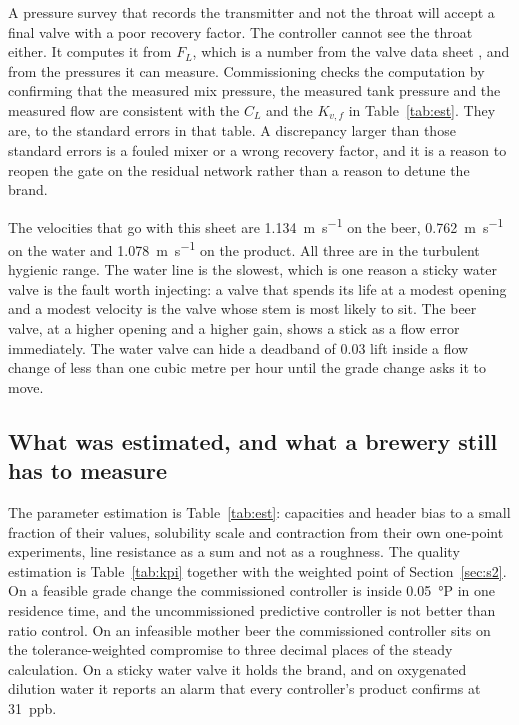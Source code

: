 A pressure survey that records the transmitter and not the throat will accept a final valve with a poor recovery factor. The controller cannot see the throat either. It computes it from $F_L$, which is a number from the valve data sheet \citep{fisher2005,iec60534}, and from the pressures it can measure. Commissioning checks the computation by confirming that the measured mix pressure, the measured tank pressure and the measured flow are consistent with the $C_L$ and the $K_{v,f}$ in Table~\ref{tab:est}. They are, to the standard errors in that table. A discrepancy larger than those standard errors is a fouled mixer or a wrong recovery factor, and it is a reason to reopen the gate on the residual network rather than a reason to detune the brand.

The velocities that go with this sheet are \SI{1.134}{\metre\per\second} on the beer, \SI{0.762}{\metre\per\second} on the water and \SI{1.078}{\metre\per\second} on the product. All three are in the turbulent hygienic range. The water line is the slowest, which is one reason a sticky water valve is the fault worth injecting: a valve that spends its life at a modest opening and a modest velocity is the valve whose stem is most likely to sit. The beer valve, at a higher opening and a higher gain, shows a stick as a flow error immediately. The water valve can hide a deadband of $0.03$ lift inside a flow change of less than one cubic metre per hour until the grade change asks it to move.

\subsection{What was estimated, and what a brewery still has to measure}

The parameter estimation is Table~\ref{tab:est}: capacities and header bias to a small fraction of their values, solubility scale and contraction from their own one-point experiments, line resistance as a sum and not as a roughness. The quality estimation is Table~\ref{tab:kpi} together with the weighted point of Section~\ref{sec:s2}. On a feasible grade change the commissioned controller is inside \SI{0.05}{\degree}P in one residence time, and the uncommissioned predictive controller is not better than ratio control. On an infeasible mother beer the commissioned controller sits on the tolerance-weighted compromise to three decimal places of the steady calculation. On a sticky water valve it holds the brand, and on oxygenated dilution water it reports an alarm that every controller's product confirms at \SI{31}{ppb}.

